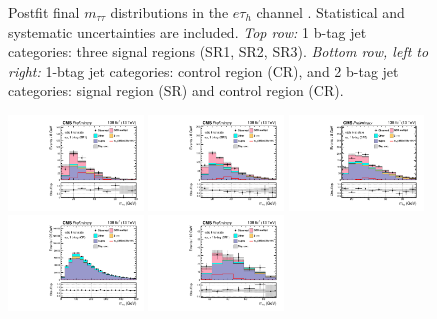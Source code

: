 \begin{figure}[ht]
\begin{center}
    \end{center}
    \caption[Postfit final $m_{\tau\tau}$ distributions in the $e\tau_{h}$ channel]{Postfit final $m_{\tau\tau}$ distributions in the $e\tau_{h}$ channel \cite{CMS-AN-20-213}. Statistical and systematic uncertainties are included. \textit{Top row:} 1 b-tag jet categories: three signal regions (SR1, SR2, SR3). \textit{Bottom row, left to right:} 1-btag jet categories: control region (CR), and 2 b-tag jet categories: signal region (SR) and control region (CR).}
    \label{fig:results_mtt_postfit_etall}
\end{figure}

\begin{figure}[ht]
    \begin{center}
        \includegraphics[width=0.32\textwidth]{figures/ch-13-results/em_all_1_post_prelim-yes.pdf}
        \includegraphics[width=0.32\textwidth]{figures/ch-13-results/em_all_2_post_prelim-yes.pdf}
        \includegraphics[width=0.32\textwidth]{figures/ch-13-results/em_all_3_post_prelim-yes.pdf}\\
        \includegraphics[width=0.32\textwidth]{figures/ch-13-results/em_all_4_post_prelim-yes.pdf}
        \includegraphics[width=0.32\textwidth]{figures/ch-13-results/em_all_5_post_prelim-yes.pdf}

\end{center}
\end{figure}
